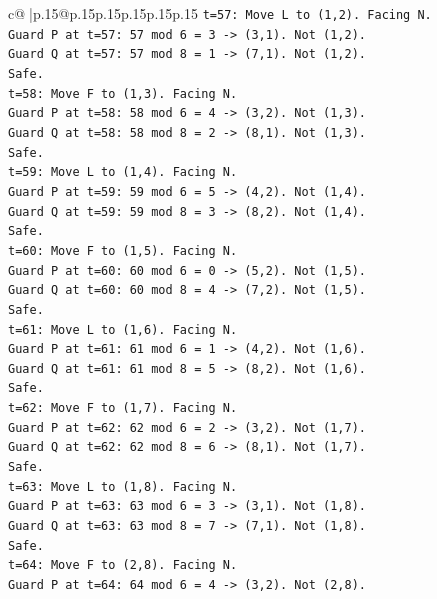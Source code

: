 \documentclass{article}
\begin{document}
{\begin{supertabular}{c@{$\;$}|p{.15\linewidth}@{}p{.15\linewidth}p{.15\linewidth}p{.15\linewidth}p{.15\linewidth}p{.15\linewidth}}
{{{\texttt{t=57: Move L to (1,2). Facing N.} \\
\texttt{Guard P at t=57: 57 mod 6 = 3 {-}> (3,1). Not (1,2).} \\
\texttt{Guard Q at t=57: 57 mod 8 = 1 {-}> (7,1). Not (1,2).} \\
\texttt{Safe.} \\
\texttt{t=58: Move F to (1,3). Facing N.} \\
\texttt{Guard P at t=58: 58 mod 6 = 4 {-}> (3,2). Not (1,3).} \\
\texttt{Guard Q at t=58: 58 mod 8 = 2 {-}> (8,1). Not (1,3).} \\
\texttt{Safe.} \\
\texttt{t=59: Move L to (1,4). Facing N.} \\
\texttt{Guard P at t=59: 59 mod 6 = 5 {-}> (4,2). Not (1,4).} \\
\texttt{Guard Q at t=59: 59 mod 8 = 3 {-}> (8,2). Not (1,4).} \\
\texttt{Safe.} \\
\texttt{t=60: Move F to (1,5). Facing N.} \\
\texttt{Guard P at t=60: 60 mod 6 = 0 {-}> (5,2). Not (1,5).} \\
\texttt{Guard Q at t=60: 60 mod 8 = 4 {-}> (7,2). Not (1,5).} \\
\texttt{Safe.} \\
\texttt{t=61: Move L to (1,6). Facing N.} \\
\texttt{Guard P at t=61: 61 mod 6 = 1 {-}> (4,2). Not (1,6).} \\
\texttt{Guard Q at t=61: 61 mod 8 = 5 {-}> (8,2). Not (1,6).} \\
\texttt{Safe.} \\
\texttt{t=62: Move F to (1,7). Facing N.} \\
\texttt{Guard P at t=62: 62 mod 6 = 2 {-}> (3,2). Not (1,7).} \\
\texttt{Guard Q at t=62: 62 mod 8 = 6 {-}> (8,1). Not (1,7).} \\
\texttt{Safe.} \\
\texttt{t=63: Move L to (1,8). Facing N.} \\
\texttt{Guard P at t=63: 63 mod 6 = 3 {-}> (3,1). Not (1,8).} \\
\texttt{Guard Q at t=63: 63 mod 8 = 7 {-}> (7,1). Not (1,8).} \\
\texttt{Safe.} \\
\texttt{t=64: Move F to (2,8). Facing N.} \\
\texttt{Guard P at t=64: 64 mod 6 = 4 {-}> (3,2). Not (2,8).} \\
}}}
\end{supertabular}}
\end{document}

